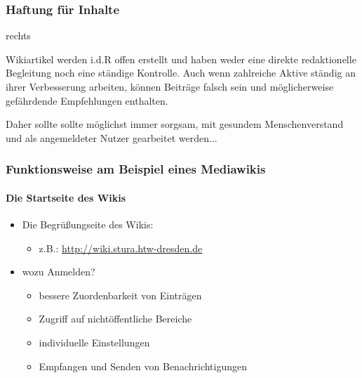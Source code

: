 \documentclass{beamer}
\begin{document}
\begin{frame}
  \frametitle{Haftung für Inhalte}
  
  rechts
 
  \begin{block}{}
    Wikiartikel werden i.d.R offen erstellt und haben weder eine direkte redaktionelle
    Begleitung noch eine ständige Kontrolle. Auch wenn zahlreiche Aktive
    ständig an ihrer Verbesserung arbeiten, können Beiträge falsch sein und
    möglicherweise gefährdende Empfehlungen enthalten.
  \end{block}
  \begin{block}{}
    Daher sollte sollte möglichst immer sorgsam, mit gesundem
    Menschenverstand und als angemeldeter Nutzer gearbeitet werden...
  \end{block}
\end{frame}


\begin{frame}
  \frametitle{Funktionsweise am Beispiel eines Mediawikis}
  \framesubtitle{Die Startseite des Wikis}

  \begin{itemize}
    \item Die Begrüßungseite des Wikis:
    \begin{itemize}
      \item z.B.: \url{http://wiki.stura.htw-dresden.de}
    \end{itemize}
    \item wozu Anmelden?
    \begin{itemize}
      \item bessere Zuordenbarkeit von Einträgen
      \item Zugriff auf nichtöffentliche Bereiche
      \item individuelle Einstellungen
      \item Empfangen und Senden von Benachrichtigungen
    \end{itemize}
  \end{itemize}
\end{frame}
\end{document}
